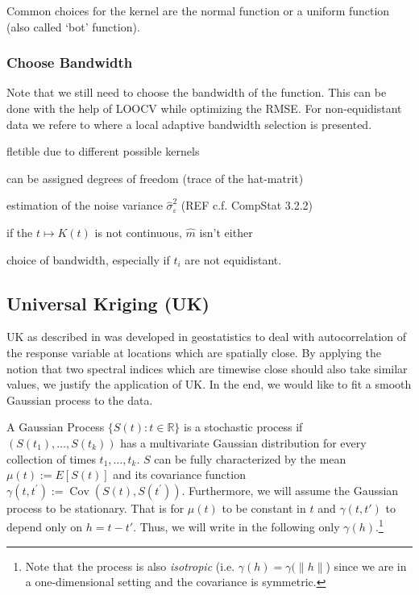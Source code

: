 		Common choices for the kernel are the normal function or a uniform function (also called `bot' function). 
		\subsubsection*{Choose Bandwidth}
		Note that we still need to choose the bandwidth of the function. This can be done with the help of LOOCV while optimizing the RMSE. For non-equidistant data we refere to \cite{brockmannLocallyAdaptiveBandwidth1993} where a local adaptive bandwidth selection is presented.

		\begin{my_pros_cons_table}{
				\item fletible due to different possible kernels
				\item can be assigned degrees of freedom (trace of the hat-matrit)
				\item estimation of the noise variance $\hat \sigma_\varepsilon^2$ (REF c.f. CompStat 3.2.2)
			}{
				\item if the $t \mapsto K(t)$ is not continuous, $\hat m $ isn't either
				\item choice of bandwidth, especially if $t_i$ are not equidistant.
			}
		\end{my_pros_cons_table}


	\subsection{Universal Kriging (UK)}
		\label{sec:Kriging}

		UK as described in \cite{diggleGaussianModelsGeostatistical2007} was developed in geostatistics to deal with autocorrelation of the response variable at locations which are spatially close. By applying the notion that two spectral indices which are timewise close should also take similar values, we justify the application of UK. In the end, we would like to fit a smooth Gaussian process to the data.

		A Gaussian Process $\{S(t) : t\in \mathbb R\} $ is a stochastic process if $(S(t_1),\dots,S(t_k))$ has a multivariate Gaussian distribution for every collection of times ${t_1, \dots , t_k}$. $S$ can be fully characterized by the mean $\mu(t):=E[S(t)]$ and its covariance function $\gamma\left(t, t^{\prime}\right):=\operatorname{Cov}\left(S(t), S\left(t^{\prime}\right)\right)$. 
		Furthermore, we will assume the Gaussian process to be stationary. That is for $\mu(t)$ to be constant in $t$ and $\gamma(t,t')$ to depend only on $h=t-t'$. Thus, we will write in the following only $\gamma(h)$.\footnote{Note that the process is also \textit{isotropic} (i.e. $\gamma(h)=\gamma(\|h\|$) since we are in a one-dimensional setting and the covariance is symmetric.}

